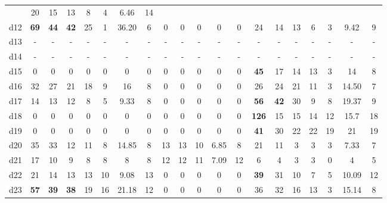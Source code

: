 \begin{tabular*}{\linewidth}{ @{\extracolsep{\fill}}c | ccccccc | ccccc | ccccccc @{}}
    &  20 & 15  &  13  &  8  &  4 &  6.46  &  14  \\
d12 & \textbf{{\color{red}69}} & \textbf{{\color{red}44}} & \textbf{{\color{red}42}}  &  25  & 1  & 36.20  &  6 
     & 0 & 0  &  0  &  0  &  0   
    &  24 & 14  & 13  &  6  &  3 &  9.42  &  9  \\
d13 &  - & -  &  -  &  -  &  - &  -  &  - 
     & - & -  &  -  &  -  &  -   
     &  - & -  &  -  &  -  &  - &  -  &  -  \\
d14 &  - & -  &  -  &  -  &  - &  -  &  - 
     & - & -  &  -  &  -  &  -   
     &  - & -  &  -  &  -  &  - &  -  &  -  \\
d15 &  0 & 0  &  0  &  0  &  0 &  0  &  0 
     & 0 & 0  &  0  &  0  &  0 
    & \textbf{{\color{red}45}} & 17 & 14  &  13  &  3  &  14  &  8 \\
d16 & 32 & 27  &  21  &  18  &  9 &  16  &  8 
     & 0 & 0  &  0  &  0  &  0   
    &  26 & 24  &  21  &  11  &  3 &  14.50  &  7  \\
d17 & 14  &  13 & 12 &8 &5 &  9.33  &  8   
     & 0 & 0  &  0  &  0  &  0 
&  \textbf{{\color{red}56}} & \textbf{{\color{red}42}}  &  30  &  9  &  8 &  19.37  &  9 \\
d18 &  0 & 0  &  0  &  0  &  0 &  0  &  0 
     & 0 & 0  &  0  &  0  &  0   
    &  \textbf{{\color{red}126}} & 15  &  15  &  14  &  12 &  15.7  &  18  \\
d19 &  0 & 0  &  0  &  0  &  0 &  0  &  0 
     & 0 & 0  &  0  &  0  &  0   
    &  \textbf{{\color{red}41}} & 30  &  22  &  22  &  19 &  21  &  19  \\
d20 &  35 & 33  &  12  &  11  &  8 &  14.85  &  8 
     & 13 & 13  &  10  &  6.85  &  8   
    &  21 & 11  &  3  &  3  &  3 &  7.33  &  7  \\
d21 &  17 & 10  &  9  &  8  &  8 &  8  &  8 
     & 12 & 12  &  11  &  7.09  &  12   
    &  6 & 4  &  3  &  3  &  0 &  4  &  5  \\
d22 &  21 & 14  &  13  &  13  &  10 &  9.08  &  13 
     & 0 & 0  &  0  &  0  &  0   
    &  \textbf{{\color{red}39}} & 31  &  10  &  7  &  5 &  10.09  &  12  \\
d23 &  \textbf{{\color{red}57}} & \textbf{{\color{red}39}}  &  \textbf{{\color{red}38}}  &  19  &  16 &  21.18  &  12 
     & 0 & 0  &  0  &  0  &  0   
    &  36 & 32  &  16  &  13  &  3 &  15.14  &  8  \\
\bottomrule
\end{tabular*}
